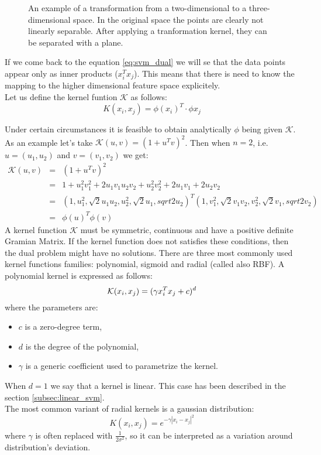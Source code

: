 \begin{figure}[htbp]
  \centering
  
  \caption{An example of a transformation from a two-dimensional to a three-dimensional space. In the original space the points are clearly not linearly separable. After applying a tranformation kernel, they can be separated with a plane.}
  \label{fig:2dto3d}
\end{figure}

If we come back to the equation \ref{eq:svm_dual} we will se that the data points appear only as inner products ($x_i^Tx_j$). This means that there is need to know the mapping to the higher dimensional feature space explicitely. \\
Let us define the kernel funtion $\mathcal{K}$ as follows:
\begin{equation}
K(x_i, x_j) = \phi(x_i)^T \cdot \phi{x_j}
\end{equation}

Under certain circumstances it is feasible to obtain analytically $\phi$ being given $\mathcal{K}$. As an example let's take $\mathcal{K}(u, v) = (1+u^Tv)^2$. Then when $n=2$, i.e. $u=(u_1,u_2)$ and $v=(v_1, v_2)$ we get:
\begin{align*}
\mathcal{K}(u, v) & = & (1+u^Tv)^2 \\
& = & 1 + u_1^2v_1^2+2u_1v_1u_2v_2+u_2^2v_2^2+2u_1v_1+2u_2v_2 \\
& = & (1, u_1^2, \sqrt{2}u_1u_2, u_2^2, \sqrt{2}u_1, sqrt{2}u_2)^T(1, v_1^2, \sqrt{2}v_1v_2, v_2^2, \sqrt{2}v_1, sqrt{2}v_2) \\
& = & \phi(u)^T\phi(v)
\end{align*}
A kernel function $\mathcal{K}$ must be symmetric, continuous and have a positive definite Gramian Matrix. If the kernel function does not satisfies these conditions, then the dual problem might have no solutions.
There are three most commonly used kernel functions families: polynomial, sigmoid and radial (called also RBF).
A polynomial kernel is expressed as follows:
\begin{equation}
\mathcal{K}(x_i, x_j) = (\gamma x_i^Tx_j + c)^d \\
\end{equation}
where the parameters are:
\begin{itemize}
\item $c$ is a zero-degree term,
\item $d$ is the degree of the polynomial,
\item $\gamma$ is a generic coefficient used to parametrize the kernel.
\end{itemize}
When $d=1$ we say that a kernel is linear. This case has been described in the section \ref{subsec:linear_svm}.
\\
The most common variant of radial kernels is a gaussian distribution:
\begin{equation}
K(x_i, x_j) = e^{-\gamma|x_i-x_j|^2}
\end{equation}
where $\gamma$ is often replaced with $\frac{1}{2\sigma^2}$, so it can be interpreted as a variation around distribution's deviation.
